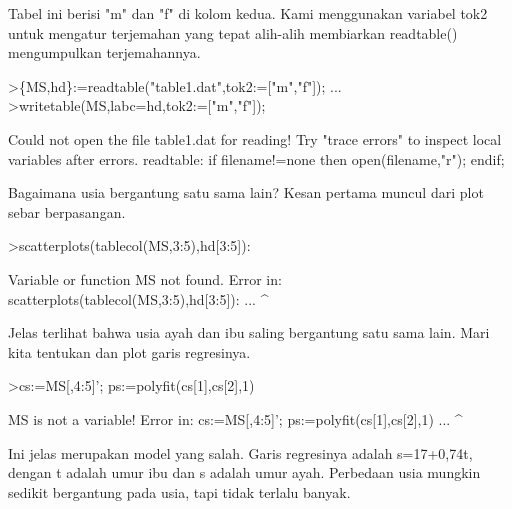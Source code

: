 \documentclass[a4paper,10pt]{article}
\begin{document}
\begin{eulernotebook}
\begin{eulercomment}
\begin{eulercomment}
\begin{eulercomment}
Tabel ini berisi "m" dan "f" di kolom kedua. Kami menggunakan variabel
tok2 untuk mengatur terjemahan yang tepat alih-alih membiarkan
readtable() mengumpulkan terjemahannya.
\end{eulercomment}
\begin{eulerprompt}
>\{MS,hd\}:=readtable("table1.dat",tok2:=["m","f"]);  ...
>writetable(MS,labc=hd,tok2:=["m","f"]);
\end{eulerprompt}
\begin{euleroutput}
  Could not open the file
  table1.dat
  for reading!
  Try "trace errors" to inspect local variables after errors.
  readtable:
      if filename!=none then open(filename,"r"); endif;
\end{euleroutput}
\begin{eulercomment}
Bagaimana usia bergantung satu sama lain? Kesan pertama muncul dari
plot sebar berpasangan.
\end{eulercomment}
\begin{eulerprompt}
>scatterplots(tablecol(MS,3:5),hd[3:5]):
\end{eulerprompt}
\begin{euleroutput}
  Variable or function MS not found.
  Error in:
  scatterplots(tablecol(MS,3:5),hd[3:5]): ...
                          ^
\end{euleroutput}
\begin{eulercomment}
Jelas terlihat bahwa usia ayah dan ibu saling bergantung satu sama
lain. Mari kita tentukan dan plot garis regresinya.
\end{eulercomment}
\begin{eulerprompt}
>cs:=MS[,4:5]'; ps:=polyfit(cs[1],cs[2],1)
\end{eulerprompt}
\begin{euleroutput}
  MS is not a variable!
  Error in:
  cs:=MS[,4:5]'; ps:=polyfit(cs[1],cs[2],1) ...
              ^
\end{euleroutput}
\begin{eulercomment}
Ini jelas merupakan model yang salah. Garis regresinya adalah
s=17+0,74t, dengan t adalah umur ibu dan s adalah umur ayah. Perbedaan
usia mungkin sedikit bergantung pada usia, tapi tidak terlalu banyak.


\end{eulercomment}
\end{eulercomment}
\end{eulercomment}
\end{eulernotebook}
\end{document}
